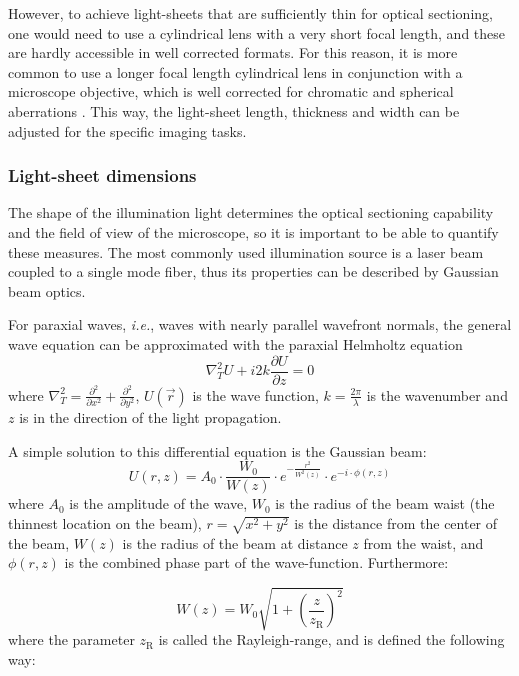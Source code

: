     However, to achieve light-sheets that are sufficiently thin for optical sectioning, one would need to use a cylindrical lens with a very short focal length, and these are hardly accessible in well corrected formats. For this reason, it is more common to use a longer focal length cylindrical lens in conjunction with a microscope objective, which is well corrected for chromatic and spherical aberrations \cite{greger_basic_2007}. This way, the light-sheet length, thickness and width can be adjusted for the specific imaging tasks.


    \subsubsection{Light-sheet dimensions}
    \label{sec:dimensions}
    

    The shape of the illumination light determines the optical sectioning capability and the field of view of the microscope, so it is important to be able to quantify these measures. The most commonly used illumination source is a laser beam coupled to a single mode fiber, thus its properties can be described by Gaussian beam optics.

    For paraxial waves, \textit{i.e.}, waves with nearly parallel wavefront normals, the general wave equation can be approximated with the paraxial Helmholtz equation \cite{saleh_fundamentals_2007}
    \begin{equation}
      \nabla_T^2 U + i 2k \frac{\partial U}{\partial z} = 0
      \label{eq:helmholtz}
    \end{equation}
    where $\nabla_T^2 = \frac{\partial^2}{\partial x^2} + \frac{\partial^2}{\partial y^2}$, $U(\vec{r})$ is the wave function, $k=\frac{2\pi}{\lambda}$ is the wavenumber and $z$ is in the direction of the light propagation.
    
    A simple solution to this differential equation is the Gaussian beam:
    \begin{equation}
      U(r,z) = A_0 \cdot \frac{W_0}{W(z)} \cdot e^{-\frac{r^2}{W^2(z)}}\cdot e^{-i\cdot \phi(r,z)}
    \label{eq:gaussian}
    \end{equation}
    where $A_0$ is the amplitude of the wave, $W_0$ is the radius of the beam waist (the thinnest location on the beam), $r=\sqrt{x^2+y^2}$ is the distance from the center of the beam, $W(z)$ is the radius of the beam  at distance $z$ from the waist, and $\phi(r,z)$ is the combined phase part of the wave-function. Furthermore:

    \begin{equation}
      W(z) = W_0\sqrt{1+\left( \frac{z}{z_\mathrm{R}} \right)^2}
    \end{equation}
    where the parameter $z_\mathrm{R}$ is called the Rayleigh-range, and is defined the following way:

